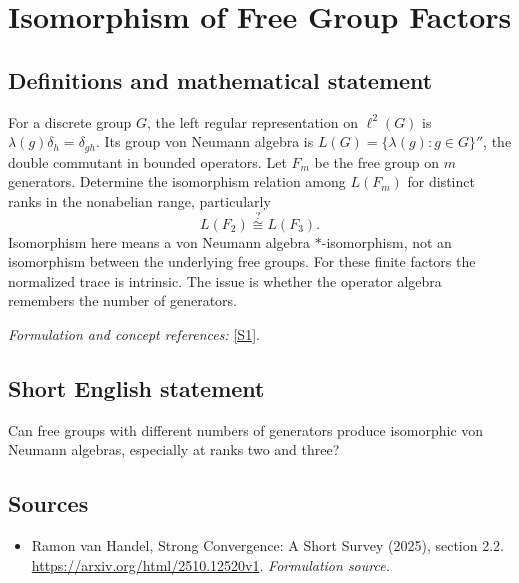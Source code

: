 \documentclass[11pt]{article}
\begin{document}
\section*{\texorpdfstring{Isomorphism of Free Group Factors}{Isomorphism of Free Group Factors}}\label{statement}
\subsection{Definitions and mathematical statement}
For a discrete group $G$, the left regular representation on $\ell^2(G)$ is $\lambda(g)\delta_h=\delta_{gh}$. Its group von Neumann algebra is
$L(G)=\{\lambda(g):g\in G\}''$, the double commutant in bounded operators. Let $F_m$ be the free group on $m$ generators. Determine the isomorphism relation among $L(F_m)$ for distinct ranks in the nonabelian range, particularly
\[
 L(F_2)\stackrel{?}{\cong}L(F_3).
\]
Isomorphism here means a von Neumann algebra $*$-isomorphism, not an isomorphism between the underlying free groups. For these finite factors the normalized trace is intrinsic. The issue is whether the operator algebra remembers the number of generators.
\par\smallskip\textit{Formulation and concept references:} \href{https://arxiv.org/html/2510.12520v1}{[S1]}.

\subsection{Short English statement}
Can free groups with different numbers of generators produce isomorphic von Neumann algebras, especially at ranks two and three?
\subsection{Sources}
\begin{itemize}
\item[S1]Ramon van Handel, Strong Convergence: A Short Survey (2025), section 2.2.
\url{https://arxiv.org/html/2510.12520v1}.
\textit{Formulation source.}
\end{itemize}
\end{document}
